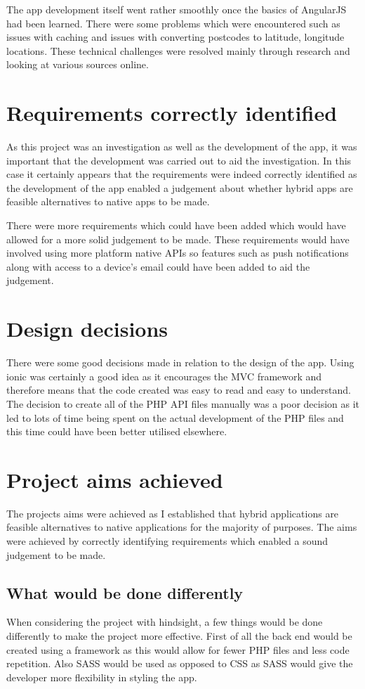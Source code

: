 The app development itself went rather smoothly once the basics of AngularJS had been learned. There were some problems which were encountered such as issues with caching and issues with converting postcodes to latitude, longitude locations. These technical challenges were resolved mainly through research and looking at various sources online.      
\section{Requirements correctly identified}
As this project was an investigation as well as the development of the app, it was important that the development was carried out to aid the investigation. In this case it certainly appears that the requirements were indeed correctly identified as the development of the app enabled a judgement about whether hybrid apps are feasible alternatives to native apps to be made.

There were more requirements which could have been added which would have allowed for a more solid judgement to be made. These requirements would have involved using more platform native APIs so features such as push notifications along with access to a device's email could have been added to aid the judgement.
\section{Design decisions}
There were some good decisions made in relation to the design of the app. Using ionic was certainly a good idea as it encourages the MVC framework and therefore means that the code created was easy to read and easy to understand. The decision to create all of the PHP API files manually was a poor decision  as it led to lots of time being spent on the actual development of the PHP files and this time could have been better utilised elsewhere.
\section{Project aims achieved}
The projects aims were achieved as I established that hybrid applications are feasible alternatives to native applications for the majority of purposes. The aims were achieved by correctly identifying requirements which enabled a sound judgement to be made.
\subsection{What would be done differently}
When considering the project with hindsight, a few things would be done differently to make the project more effective. First of all the back end would be created using a framework as this would allow for fewer PHP files and less code repetition. Also SASS would be used as opposed to CSS as SASS would give the developer more flexibility in styling the app.

